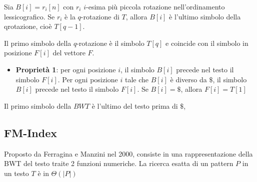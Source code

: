 Sia $B[i] = r_i[n]$ con $r_i$ $i$-esima più piccola rotazione nell'ordinamento
lessicografico. Se $r_i$ è la $q$-rotazione di $T$, allora $B[i]$ è l'ultimo
simbolo della qrotazione, cioè $T[q-1]$.

Il primo simbolo della $q$-rotazione è il simbolo $T[q]$ e coincide con il simbolo
in posizione $F[i]$ del vettore $F$.
\begin{itemize}
    \item \textbf{Proprietà 1}: per ogni posizione $i$, il simbolo $B[i]$ precede
          nel testo il simbolo $F[i]$. Per ogni posizione $i$ tale che $B[i]$ è
          diverso da $\$$, il simbolo $B[i]$ precede nel testo il simbolo $F[i]$.
          Se $B[i] = \$$, allora $F[i] = T[1]$
\end{itemize}
\begin{nota}
    Il primo simbolo della $BWT$ è l'ultimo del testo prima di $\$$,
\end{nota}
\subsection{FM-Index}
Proposto da Ferragina e Manzini nel 2000, consiste in una rappresentazione della
BWT del testo traite 2 funzioni numeriche. La ricerca esatta di un pattern $P$ in
un testo $T$ è in $\Theta(|P|)$